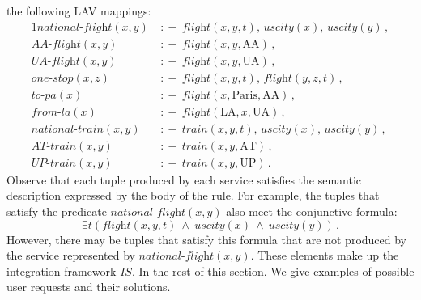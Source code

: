 \documentclass{llncs}
\newcommand{\qrule}{:\!\!-}
\newcommand{\AAflight}{\textit{AA-flight}}
\newcommand{\UAflight}{\textit{UA-flight}}
\newcommand{\ATtrain}{\textit{AT-train}}
\newcommand{\UPtrain}{\textit{UP-train}}
\newcommand{\flight}{\textit{flight}}
\newcommand{\train}{\textit{train}}
\newcommand{\UScity}{\textit{uscity}}
\renewcommand{\AA}{\text{AA}}
\newcommand{\UA}{\text{UA}}
\newcommand{\AT}{\text{AT}}
\newcommand{\UP}{\text{UP}}
\newcommand{\PA}{\text{Paris}}
\newcommand{\LA}{\text{LA}}
\newcommand{\nationalFlight}{\textit{national-flight}}
\newcommand{\nationalTrain}{\textit{national-train}}
\newcommand{\onestop}{\textit{one-stop}}
\newcommand{\toPA}{\textit{to-pa}}
\newcommand{\onestopPA}{\textit{onestop-to-pa}}
\newcommand{\fromLA}{\textit{from-la}}
\begin{document}
the following LAV mappings:
\begin{alignat*}{1}
\nationalFlight(x,y)\ &\qrule\ \flight(x,y,t),\,\UScity(x),\,\UScity(y)\,, \\
\AAflight(x,y)\       &\qrule\ \flight(x,y,\AA)\,, \\
\UAflight(x,y)\       &\qrule\ \flight(x,y,\UA)\,, \\
\onestop(x,z)\        &\qrule\ \flight(x,y,t),\,\flight(y,z,t)\,, \\
\toPA(x)\             &\qrule\ \flight(x,\PA,\AA)\,, \\
\fromLA(x)\           &\qrule\ \flight(\LA,x,\UA)\,, \\
\nationalTrain(x,y)\  &\qrule\ \train(x,y,t),\,\UScity(x),\,\UScity(y)\,, \\
\ATtrain(x,y)\        &\qrule\ \train(x,y,\AT)\,, \\
\UPtrain(x,y)\        &\qrule\ \train(x,y,\UP)\,.
\end{alignat*}
Observe that each tuple produced by each service satisfies the semantic description
expressed by the body of the rule. For example, the tuples that satisfy the predicate
$\nationalFlight(x,y)$ also meet the conjunctive formula:
\[ \exists t(\flight(x,y,t)\ \land\ \UScity(x)\ \land\ \UScity(y))\,. \]
However, there may be tuples that satisfy this formula that are not
produced by the service represented by $\nationalFlight(x,y)$.
These elements make up the integration framework $IS$. In the rest of this section.
We give examples of possible user requests and their solutions.
\end{document}
